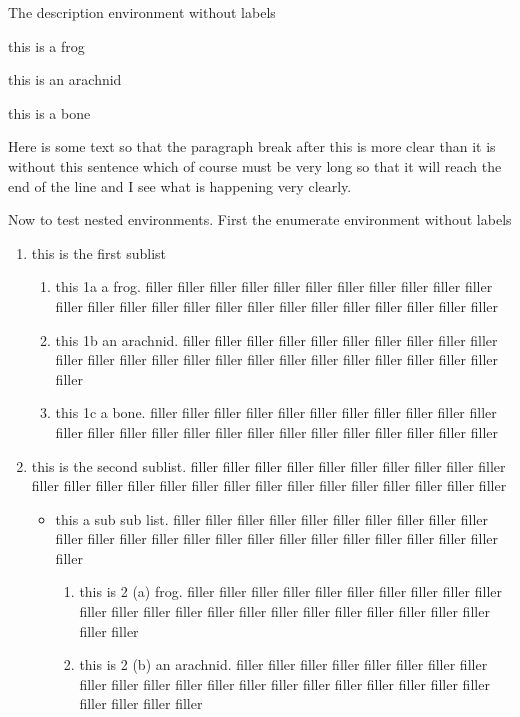 \documentclass{article}
\begin{document}
The description environment without labels
\begin{description}
\item[] this is a frog
\item[] this is an arachnid
\item this is a bone
\end{description}
Here is some text so that the paragraph break after this
is more clear than it is without this sentence which of
course must be very long so that it will reach the end of
the line and I see what is happening very clearly.

Now to test nested environments.  First the enumerate 
environment without labels
\begin{enumerate}
\item this is the first sublist
   \begin{enumerate}
   \item this 1a a frog. filler filler filler filler filler filler filler filler filler filler filler filler filler filler filler filler filler filler filler filler filler filler filler filler filler 
   \item this 1b an arachnid. filler filler filler filler filler filler filler filler filler filler filler filler filler filler filler filler filler filler filler filler filler filler filler filler filler 
   \item this 1c a bone. filler filler filler filler filler filler filler filler filler filler filler filler filler filler filler filler filler filler filler filler filler filler filler filler filler 
   \end{enumerate}
\item this is the second sublist. filler filler filler filler filler filler filler filler filler filler filler filler filler filler filler filler filler filler filler filler filler filler filler filler filler 
   \begin{itemize}
   \item this a sub sub list. filler filler filler filler filler filler filler filler filler filler filler filler filler filler filler filler filler filler filler filler filler filler filler filler filler 
      \begin{enumerate}
      \item this is 2 (a) frog. filler filler filler filler filler filler filler filler filler filler filler filler filler filler filler filler filler filler filler filler filler filler filler filler filler 
      \item this is 2 (b) an arachnid. filler filler filler filler filler filler filler filler filler filler filler filler filler filler filler filler filler filler filler filler filler filler filler filler filler 

\end{enumerate}
\end{itemize}
\end{enumerate}
\end{document}
